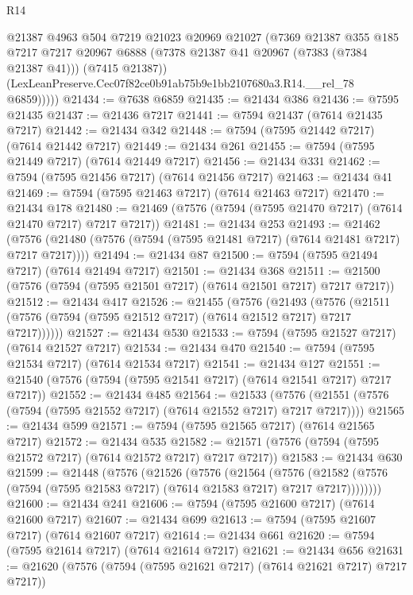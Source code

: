\begin{lexlean}{R14}
\begin{coremodule}
            @21387
            @4963
            @504
            @7219
            @21023
            @20969
            @21027
            (@7369
              @21387
              @355
              @185
              @7217
              @7217
              @20967
              @6888
              (@7378 @21387 @41 @20967 (@7383 (@7384 @21387 @41)))
              (@7415 @21387))
            (LexLeanPreserve.Cec07f82ce0b91ab75b9e1bb2107680a3.R14.__rel_78 @6859)))))
@21434 := @7638 @6859
@21435 := @21434 @386
@21436 := @7595 @21435
@21437 := @21436 @7217
@21441 := @7594 @21437 (@7614 @21435 @7217)
@21442 := @21434 @342
@21448 := @7594 (@7595 @21442 @7217) (@7614 @21442 @7217)
@21449 := @21434 @261
@21455 := @7594 (@7595 @21449 @7217) (@7614 @21449 @7217)
@21456 := @21434 @331
@21462 := @7594 (@7595 @21456 @7217) (@7614 @21456 @7217)
@21463 := @21434 @41
@21469 := @7594 (@7595 @21463 @7217) (@7614 @21463 @7217)
@21470 := @21434 @178
@21480 := @21469 (@7576 (@7594 (@7595 @21470 @7217) (@7614 @21470 @7217) @7217 @7217))
@21481 := @21434 @253
@21493 := @21462
    (@7576 (@21480 (@7576 (@7594 (@7595 @21481 @7217) (@7614 @21481 @7217) @7217 @7217))))
@21494 := @21434 @87
@21500 := @7594 (@7595 @21494 @7217) (@7614 @21494 @7217)
@21501 := @21434 @368
@21511 := @21500 (@7576 (@7594 (@7595 @21501 @7217) (@7614 @21501 @7217) @7217 @7217))
@21512 := @21434 @417
@21526 := @21455
    (@7576
      (@21493
        (@7576 (@21511 (@7576 (@7594 (@7595 @21512 @7217) (@7614 @21512 @7217) @7217 @7217))))))
@21527 := @21434 @530
@21533 := @7594 (@7595 @21527 @7217) (@7614 @21527 @7217)
@21534 := @21434 @470
@21540 := @7594 (@7595 @21534 @7217) (@7614 @21534 @7217)
@21541 := @21434 @127
@21551 := @21540 (@7576 (@7594 (@7595 @21541 @7217) (@7614 @21541 @7217) @7217 @7217))
@21552 := @21434 @485
@21564 := @21533
    (@7576 (@21551 (@7576 (@7594 (@7595 @21552 @7217) (@7614 @21552 @7217) @7217 @7217))))
@21565 := @21434 @599
@21571 := @7594 (@7595 @21565 @7217) (@7614 @21565 @7217)
@21572 := @21434 @535
@21582 := @21571 (@7576 (@7594 (@7595 @21572 @7217) (@7614 @21572 @7217) @7217 @7217))
@21583 := @21434 @630
@21599 := @21448
    (@7576
      (@21526
        (@7576
          (@21564
            (@7576
              (@21582 (@7576 (@7594 (@7595 @21583 @7217) (@7614 @21583 @7217) @7217 @7217))))))))
@21600 := @21434 @241
@21606 := @7594 (@7595 @21600 @7217) (@7614 @21600 @7217)
@21607 := @21434 @699
@21613 := @7594 (@7595 @21607 @7217) (@7614 @21607 @7217)
@21614 := @21434 @661
@21620 := @7594 (@7595 @21614 @7217) (@7614 @21614 @7217)
@21621 := @21434 @656
@21631 := @21620 (@7576 (@7594 (@7595 @21621 @7217) (@7614 @21621 @7217) @7217 @7217))

\end{coremodule}
\end{lexlean}
